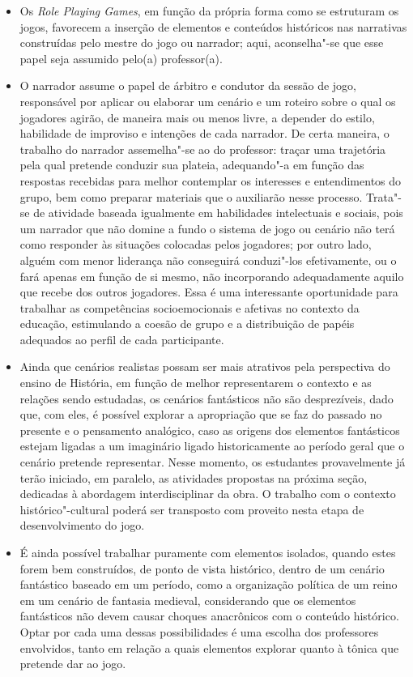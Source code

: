 \documentclass[11pt]{extarticle}
\begin{document}
\begin{itemize}
\item
  Os \emph{Role Playing Games}, em função da própria forma como se
  estruturam os jogos, favorecem a inserção de elementos e conteúdos
  históricos nas narrativas construídas pelo mestre do jogo ou narrador;
  aqui, aconselha"-se que esse papel seja assumido pelo(a) professor(a).
\item
  O narrador assume o papel de árbitro e condutor da sessão de jogo,
  responsável por aplicar ou elaborar um cenário e um roteiro sobre o
  qual os jogadores agirão, de maneira mais ou menos livre, a depender
  do estilo, habilidade de improviso e intenções de cada narrador. De
  certa maneira, o trabalho do narrador assemelha"-se ao do professor:
  traçar uma trajetória pela qual pretende conduzir sua plateia,
  adequando"-a em função das respostas recebidas para melhor contemplar
  os interesses e entendimentos do grupo, bem como preparar materiais
  que o auxiliarão nesse processo. Trata"-se de atividade baseada
  igualmente em habilidades intelectuais e sociais, pois um narrador que
  não domine a fundo o sistema de jogo ou cenário não terá como
  responder às situações colocadas pelos jogadores; por outro lado,
  alguém com menor liderança não conseguirá conduzi"-los efetivamente, ou
  o fará apenas em função de si mesmo, não incorporando adequadamente
  aquilo que recebe dos outros jogadores. Essa é uma interessante
  oportunidade para trabalhar as competências socioemocionais e afetivas
  no contexto da educação, estimulando a coesão de grupo e a
  distribuição de papéis adequados ao perfil de cada participante.
\item
  Ainda que cenários realistas possam ser mais atrativos pela
  perspectiva do ensino de História, em função de melhor representarem o
  contexto e as relações sendo estudadas, os cenários fantásticos não
  são desprezíveis, dado que, com eles, é possível explorar a
  apropriação que se faz do passado no presente e o pensamento
  analógico, caso as origens dos elementos fantásticos estejam ligadas a
  um imaginário ligado historicamente ao período geral que o cenário
  pretende representar. Nesse momento, os estudantes provavelmente já
  terão iniciado, em paralelo, as atividades propostas na próxima seção,
  dedicadas à abordagem interdisciplinar da obra. O trabalho com o
  contexto histórico"-cultural poderá ser transposto com proveito nesta
  etapa de desenvolvimento do jogo.
\item
  É ainda possível trabalhar puramente com elementos isolados, quando
  estes forem bem construídos, de ponto de vista histórico, dentro de um
  cenário fantástico baseado em um período, como a organização política
  de um reino em um cenário de fantasia medieval, considerando que os
  elementos fantásticos não devem causar choques anacrônicos com o
  conteúdo histórico. Optar por cada uma dessas possibilidades é uma
  escolha dos professores envolvidos, tanto em relação a quais elementos
  explorar quanto à tônica que pretende dar ao jogo.
\end{itemize}
\end{document}
